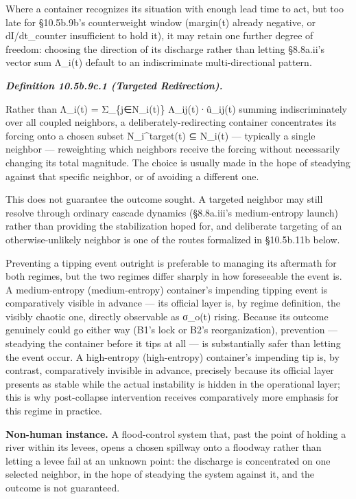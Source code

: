 \documentclass[
]{article}
\begin{document}
Where a container recognizes its situation with enough lead time to act,
but too late for §10.5b.9b's counterweight window (margin(t) already
negative, or dI/dt\_counter insufficient to hold it), it may retain one
further degree of freedom: choosing the direction of its discharge
rather than letting §8.8a.ii's vector sum ⃗Λ\_i(t) default to an
indiscriminate multi-directional pattern.

\emph{\textbf{Definition 10.5b.9c.1 (Targeted Redirection).}}

Rather than ⃗Λ\_i(t) = Σ\_\{j∈N\_i(t)\} Λ\_ij(t)·û\_ij(t) summing
indiscriminately over all coupled neighbors, a deliberately-redirecting
container concentrates its forcing onto a chosen subset
N\_i\^{}target(t) ⊆ N\_i(t) --- typically a single neighbor ---
reweighting which neighbors receive the forcing without necessarily
changing its total magnitude. The choice is usually made in the hope of
steadying against that specific neighbor, or of avoiding a different
one.

This does not guarantee the outcome sought. A targeted neighbor may
still resolve through ordinary cascade dynamics (§8.8a.iii's
medium-entropy launch) rather than providing the stabilization hoped
for, and deliberate targeting of an otherwise-unlikely neighbor is one
of the routes formalized in §10.5b.11b below.

Preventing a tipping event outright is preferable to managing its
aftermath for both regimes, but the two regimes differ sharply in how
foreseeable the event is. A medium-entropy (medium-entropy) container's
impending tipping event is comparatively visible in advance --- its
official layer is, by regime definition, the visibly chaotic one,
directly observable as σ\_o(t) rising. Because its outcome genuinely
could go either way (B1's lock or B2's reorganization), prevention ---
steadying the container before it tips at all --- is substantially safer
than letting the event occur. A high-entropy (high-entropy) container's
impending tip is, by contrast, comparatively invisible in advance,
precisely because its official layer presents as stable while the actual
instability is hidden in the operational layer; this is why
post-collapse intervention receives comparatively more emphasis for this
regime in practice.

\textbf{Non-human instance.} A flood-control system that, past the point
of holding a river within its levees, opens a chosen spillway onto a
floodway rather than letting a levee fail at an unknown point: the
discharge is concentrated on one selected neighbor, in the hope of
steadying the system against it, and the outcome is not guaranteed.
\end{document}
